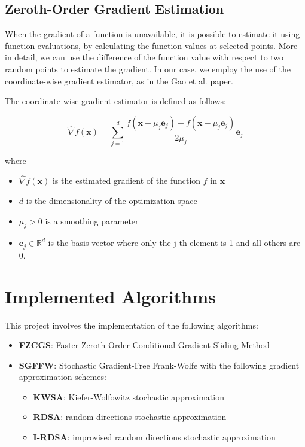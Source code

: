 \documentclass[10pt,twocolumn,letterpaper]{article}
\begin{document}
\subsection{Zeroth-Order Gradient Estimation}

When the gradient of a function is unavailable, it is possible to estimate it using function evaluations,
by calculating the function values at selected points. More in detail, we can use the difference of the
function value with respect to two random points to estimate the gradient. In our case, we employ the use of
the coordinate-wise gradient estimator, as in the Gao et al. paper.

The coordinate-wise gradient estimator is defined as follows:

\[
\hat{\nabla} f(\mathbf{x})=\sum_{j=1}^{d} \frac{f\left(\mathbf{x}+\mu_{j} \mathbf{e}_{j}\right)-f\left(\mathbf{x}-\mu_{j} \mathbf{e}_{j}\right)}{2 \mu_{j}} \mathbf{e}_{j}
\]

where

\begin{itemize}



\item $\hat{\nabla} f(\mathbf{x})$ is the estimated gradient of the function $f$ in $\mathbf{x}$

\item $d$ is the dimensionality of the optimization space

\item $\mu_{j}>0$ is a smoothing parameter

\item $\mathbf{e}_{j} \in \mathbb{R}^{d}$ is the basis vector where only the j-th element is 1 and all others are 0.

\end{itemize}

\section{Implemented Algorithms}

This project involves the implementation of the following algorithms:

\begin{itemize}
   \item \textbf{FZCGS}: Faster Zeroth-Order Conditional Gradient Sliding Method
   \item \textbf{SGFFW}: Stochastic Gradient-Free Frank-Wolfe with the following gradient approximation schemes:
      \begin{itemize}
         \item \textbf{KWSA}: Kiefer-Wolfowitz stochastic approximation
         \item \textbf{RDSA}: random directions stochastic approximation
         \item \textbf{I-RDSA}: improvised random directions stochastic approximation
      \end{itemize}
\end{itemize}
\end{document}
